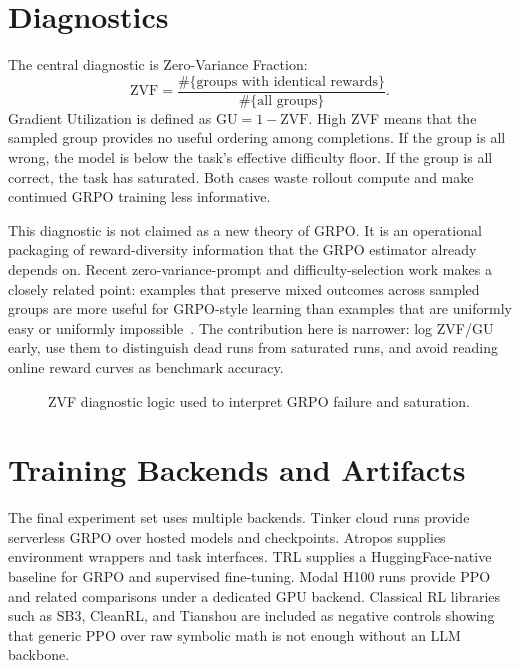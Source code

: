\documentclass[12pt,a4paper]{report}
\newcommand{\zvf}{\mathrm{ZVF}}
\newcommand{\gu}{\mathrm{GU}}
\newcommand{\fitdiagram}[1]{\resizebox{\textwidth}{!}{}}
\begin{document}
\section{Diagnostics}
\label{sec:diagnostics}

The central diagnostic is Zero-Variance Fraction:
\begin{equation}
  \zvf = \frac{\#\{\text{groups with identical rewards}\}}{\#\{\text{all groups}\}}.
\end{equation}
Gradient Utilization is defined as $\gu=1-\zvf$. High ZVF means that the sampled group provides no useful ordering among completions. If the group is all wrong, the model is below the task's effective difficulty floor. If the group is all correct, the task has saturated. Both cases waste rollout compute and make continued GRPO training less informative.

This diagnostic is not claimed as a new theory of GRPO. It is an operational packaging of reward-diversity information that the GRPO estimator already depends on. Recent zero-variance-prompt and difficulty-selection work makes a closely related point: examples that preserve mixed outcomes across sampled groups are more useful for GRPO-style learning than examples that are uniformly easy or uniformly impossible~\citep{rlzvp2025,bae2025online,rcgrpo2026,pikus2025hardexamples}. The contribution here is narrower: log ZVF/GU early, use them to distinguish dead runs from saturated runs, and avoid reading online reward curves as benchmark accuracy.

\begin{figure}[ht]
  \centering
  \fitdiagram{tikz/zvf_diagnostic.tex}
  \caption{ZVF diagnostic logic used to interpret GRPO failure and saturation.}
  \label{fig:zvf-diagnostic}
\end{figure}

\section{Training Backends and Artifacts}
\label{sec:training-backends}

The final experiment set uses multiple backends. Tinker cloud runs provide serverless GRPO over hosted models and checkpoints. Atropos supplies environment wrappers and task interfaces. TRL supplies a HuggingFace-native baseline for GRPO and supervised fine-tuning. Modal H100 runs provide PPO and related comparisons under a dedicated GPU backend. Classical RL libraries such as SB3, CleanRL, and Tianshou are included as negative controls showing that generic PPO over raw symbolic math is not enough without an LLM backbone.
\end{document}
